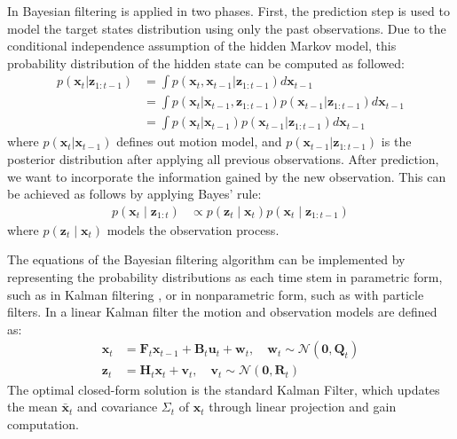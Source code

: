In Bayesian filtering is applied in two phases. First, the prediction step is used to model the target states distribution using only the past observations. Due to the conditional independence assumption of the hidden Markov model, this probability distribution of the hidden state can be computed as followed:
\begin{align*}
  p(\mathbf{x}_t|\mathbf{z}_{1:t-1}) &= \int p(\mathbf{x}_t, \mathbf{x}_{t-1} | \mathbf{z}_{1:t-1}) d\mathbf{x}_{t-1} \\
  &= \int p(\mathbf{x}_t | \mathbf{x}_{t-1}, \mathbf{z}_{1:t-1}) p(\mathbf{x}_{t-1} | \mathbf{z}_{1:t-1}) d\mathbf{x}_{t-1} \\
  &= \int p(\mathbf{x}_t | \mathbf{x}_{t-1}) p(\mathbf{x}_{t-1} | \mathbf{z}_{1:t-1}) d\mathbf{x}_{t-1}
\end{align*}
where $p(\mathbf{x}_t | \mathbf{x}_{t-1})$ defines out motion model, and $p(\mathbf{x}_{t-1} | \mathbf{z}_{1:t-1})$ is the posterior distribution after applying all previous observations. After prediction, we want to incorporate the information gained by the new observation. This can be achieved as follows by applying Bayes' rule:
\begin{align*}
  p(\mathbf{x}_t \mid \mathbf{z}_{1:t}) &\propto p(\mathbf{z}_t \mid \mathbf{x}_t) p(\mathbf{x}_t \mid \mathbf{z}_{1:t-1})
\end{align*}
where $p(\mathbf{z}_t \mid \mathbf{x}_t)$ models the observation process.

The equations of the Bayesian filtering algorithm can be implemented by representing the probability distributions as each time stem in parametric form, such as in Kalman filtering \parencite[p. 132-134]{Lanz2026Notes} \parencite{bar2001estimation}, or in nonparametric form, such as with particle filters. In a linear Kalman filter the motion and observation models are defined as:
\begin{align*}
  \mathbf{x}_t &= \mathbf{F}_t \mathbf{x}_{t-1} + \mathbf{B}_t \mathbf{u}_t + \mathbf{w}_t, \quad \mathbf{w}_t \sim \mathcal{N}(\mathbf{0}, \mathbf{Q}_t) \\
  \mathbf{z}_t &= \mathbf{H}_t\mathbf{x}_t + \mathbf{v}_t, \quad \mathbf{v}_t \sim \mathcal{N}(\mathbf{0}, \mathbf{R}_t)
\end{align*}
The optimal closed-form solution is the standard Kalman Filter, which updates the mean $\mathbf{\bar{x}}_t$ and covariance $\Sigma_t$ of $\mathbf{x}_t$ through linear projection and gain computation.

